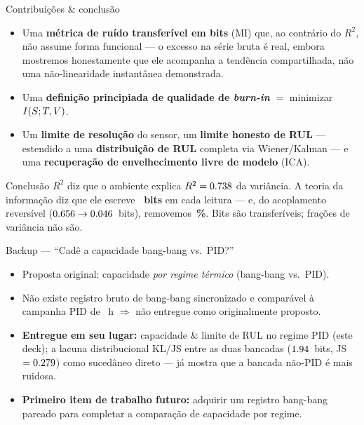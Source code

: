 \documentclass[aspectratio=169,11pt]{beamer}
\begin{document}
\begin{frame}{Contribuições \& conclusão}
  \begin{itemize}
    \item Uma \textbf{métrica de ruído transferível em bits} (MI) que, ao
          contrário do $R^2$, não assume forma funcional --- o excesso na
          série bruta é real, embora mostremos honestamente que ele
          acompanha a tendência compartilhada, não uma não-linearidade
          instantânea demonstrada.
    \item Uma \textbf{definição principiada de qualidade de \emph{burn-in}} $=$
          minimizar $I\!\left(S ; T,V\right)$.
    \item Um \textbf{limite de resolução} do sensor, um \textbf{limite honesto de RUL} ---
          estendido a uma \textbf{distribuição de RUL} completa via Wiener/Kalman ---
          e uma \textbf{recuperação de envelhecimento livre de modelo} (ICA).
  \end{itemize}
  \vfill
  \begin{alertblock}{Conclusão}
    $R^2$ diz que o ambiente explica $R^2=0.738$ da variância. A
    teoria da informação diz que ele escreve \textbf{\valMIstv~bits} em
    cada leitura --- e, do acoplamento reversível
    ($0.656\to0.046$~bits), removemos
    \textbf{\valMIreductionPct\,\%}. Bits são transferíveis; frações de
    variância não são.
  \end{alertblock}
\end{frame}

\appendix
\begin{frame}{Backup --- ``Cadê a capacidade bang-bang vs.\ PID?''}
  \begin{itemize}
    \item Proposta original: capacidade \emph{por regime térmico}
          (bang-bang vs.\ PID).
    \item Não existe registro bruto de bang-bang sincronizado e comparável
          à campanha PID de \valDurationHours~h $\Rightarrow$ não entregue
          como originalmente proposto.
    \item \textbf{Entregue em seu lugar:} capacidade \& limite de RUL no
          regime PID (este deck); a lacuna distribucional KL/JS entre as
          duas bancadas ($1.94$~bits, JS $=0.279$) como
          sucedâneo direto --- já mostra que a bancada não-PID é mais ruidosa.
    \item \textbf{Primeiro item de trabalho futuro:} adquirir um registro
          bang-bang pareado para completar a comparação de capacidade por regime.
  \end{itemize}
\end{frame}
\end{document}
